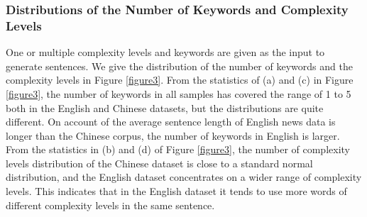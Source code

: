 \documentclass[11pt]{article}
\begin{document}
\subsubsection{Distributions of the Number of Keywords and Complexity Levels}
One or multiple complexity levels and keywords are given as the input to generate sentences. We give the distribution of the number of keywords and the complexity levels in Figure \ref{figure3}. From the statistics of (a) and (c) in Figure \ref{figure3}, the number of keywords in all samples has covered the range of 1 to 5 both in the English and Chinese datasets, but the distributions are quite different. On account of the average sentence length of English news data is longer than the Chinese corpus, the number of keywords in English is larger.  From the statistics in (b) and (d) of Figure \ref{figure3}, the number of complexity levels distribution of the Chinese dataset is close to a standard normal distribution, and the English dataset concentrates on a wider range of complexity levels. This indicates that in the English dataset it tends to use more words of different complexity levels in the same sentence.
\end{document}
